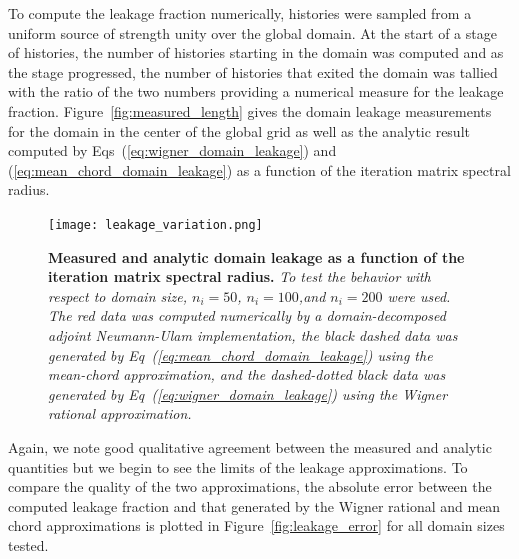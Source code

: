 \documentclass{mc2013}
\begin{document}
To compute the leakage fraction numerically,  histories were
sampled from a uniform source of strength unity over the global
domain. At the start of a stage of histories, the number of histories
starting in the domain was computed and as the stage progressed, the
number of histories that exited the domain was tallied with the ratio
of the two numbers providing a numerical measure for the leakage
fraction. Figure~\ref{fig:measured_length} gives the domain leakage
measurements for the domain in the center of the global grid as well
as the analytic result computed by
Eqs~(\ref{eq:wigner_domain_leakage}) and
(\ref{eq:mean_chord_domain_leakage}) as a function of the iteration
matrix spectral radius.
\begin{figure}[ht!]
  \begin{spacing}{1.0}
    \begin{center}
      \texttt{[image: leakage\_variation.png]}
    \end{center}
    \caption{\textbf{Measured and analytic domain leakage as a
        function of the iteration matrix spectral radius.} \textit{To
        test the behavior with respect to domain size, $n_i=50$,
        $n_i=100$,and $n_i=200$ were used. The red data was computed
        numerically by a domain-decomposed adjoint Neumann-Ulam
        implementation, the black dashed data was generated by
        Eq~(\ref{eq:mean_chord_domain_leakage}) using the mean-chord
        approximation, and the dashed-dotted black data was generated
        by Eq~(\ref{eq:wigner_domain_leakage}) using the Wigner
        rational approximation.}}
    \label{fig:measured_leakage}
  \end{spacing}
\end{figure}
Again, we note good qualitative agreement between the measured and
analytic quantities but we begin to see the limits of the leakage
approximations. To compare the quality of the two approximations, the
absolute error between the computed leakage fraction and that
generated by the Wigner rational and mean chord approximations is
plotted in Figure~\ref{fig:leakage_error} for all domain sizes
tested. 
\end{document}
